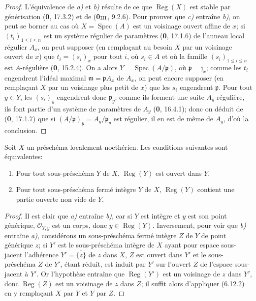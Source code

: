 \begin{proof}
L'équivalence de \emph{a)} et \emph{b)} résulte de ce que $\operatorname{Reg}(X)$ est
stable par générisation (\textbf{0}, 17.3.2) et de (\textbf{0}$_{\rm III}$, 9.2.6). Pour
prouver que \emph{c)} entraîne \emph{b)}, on peut se borner au cas où
$X=\operatorname{Spec}(A)$ est un voisinage ouvert affine de $x$; si
$(t_i)_{1\leq i\leq n}$ est un système régulier de paramètres (\textbf{0}, 17.1.6)
de l'anneau local régulier $A_x$, on peut supposer (en remplaçant au besoin
$X$ par un voisinage ouvert de $x$) que $t_i=(s_i)_x$ pour tout $i$, où
$s_i\in A$ et où la famille $(s_i)_{1\leq i\leq n}$ est $A$-régulière
(\textbf{0}, 15.2.4). On a alors $Y=\operatorname{Spec}(A/\mathfrak p)$, où
$\mathfrak p=\mathfrak j_x$; comme les $t_i$ engendrent l'idéal maximal
$\mathfrak m=\mathfrak pA_x$ de $A_x$, on peut encore supposer (en
remplaçant $X$ par un voisinage plus petit de $x$) que les $s_i$ engendrent
$\mathfrak p$. Pour tout $y\in Y$, les $(s_i)_y$ engendrent donc
$\mathfrak p_y$; comme ils forment une suite $A_y$-régulière, ils font
partie d'un système de paramètres de $A_y$ (\textbf{0}, 16.4.1); donc on déduit de
(\textbf{0}, 17.1.7) que si $(A/\mathfrak p)_y=A_y/\mathfrak p_y$ est régulier, il
en est de même de $A_y$, d'où la conclusion.
\end{proof}

\begin{corollary}[6.12.3]
\label{IV.2.s6.12.3-fr}
Soit $X$ un préschéma localement noethérien. Les conditions suivantes sont
équivalentes:
\begin{enumerate}
\item[\textup{a)}] Pour tout sous-préschéma $Y$ de $X$,
$\operatorname{Reg}(Y)$ est ouvert dans $Y$.


\item[\textup{b)}] Pour tout sous-préschéma fermé intègre $Y$ de $X$,
$\operatorname{Reg}(Y)$ contient une partie ouverte non vide de $Y$.
\end{enumerate}
\end{corollary}

\begin{proof}
Il est clair que \emph{a)} entraîne \emph{b)}, car si $Y$ est intègre et $y$ est son point
générique, $\mathcal O_{Y,y}$ est un corps, donc $y\in\operatorname{Reg}(Y)$.
Inversement, pour voir que \emph{b)} entraîne \emph{a)}, considérons un sous-préschéma
fermé intègre $Z$ de $Y$ de point générique $z$; si $Y'$ est le
sous-préschéma intègre de $X$ ayant pour espace sous-jacent l'adhérence
$Y'=\overline{\{z\}}$ de $z$ dans $X$, $Z$ est ouvert dans $Y'$ et le
sous-préschéma $Z$ de $Y'$, étant réduit, est induit par $Y'$ sur l'ouvert
$Z$ de l'espace sous-jacent à $Y'$. Or l'hypothèse entraîne que
$\operatorname{Reg}(Y')$ est un voisinage de $z$ dans $Y'$, donc
$\operatorname{Reg}(Z)$ est un voisinage de $z$ dans $Z$; il suffit alors
d'appliquer (6.12.2) en y remplaçant $X$ par $Y$ et $Y$ par $Z$.
\end{proof}

